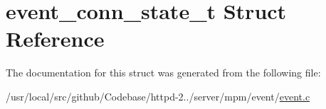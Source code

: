 \hypertarget{structevent__conn__state__t}{}\section{event\+\_\+conn\+\_\+state\+\_\+t Struct Reference}
\label{structevent__conn__state__t}


The documentation for this struct was generated from the following file\+:\begin{DoxyCompactItemize}
\item 
/usr/local/src/github/\+Codebase/httpd-\/2../server/mpm/event/\hyperlink{event_8c}{event.\+c}\end{DoxyCompactItemize}
